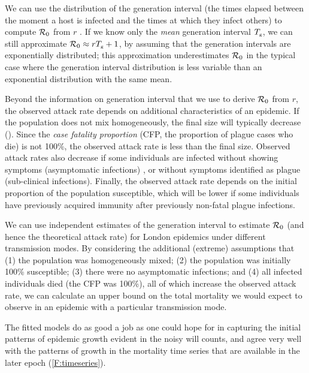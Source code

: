 We can use the distribution of the generation interval (the times elapsed between the moment a host is infected and the times at which they infect others) to compute ${\mathcal R}_0$ from $r$ \cite{WallLips07}. If we know only the \emph{mean} generation interval $T_{\mbox{\tiny g}}$, we can still approximate ${\mathcal R}_0 \approx r T_{\mbox{\tiny g}} +1$, by assuming that the generation intervals are exponentially distributed; this approximation underestimates ${\mathcal R}_0$ in the typical case where the generation interval distribution is less variable than an exponential distribution with the same mean.

Beyond the information on generation interval that we use to derive ${\mathcal R}_0$ from $r$, the observed attack rate depends on additional characteristics of an epidemic. If the population does not mix homogeneously, the final size will typically decrease (\eg \cite[Fig.\,6]{Roll+15}). Since the \emph{case fatality proportion} (CFP, the proportion of plague cases who die) is not 100\%, the observed attack rate is less than the final size. Observed attack rates also decrease if some individuals are infected without showing symptoms (asymptomatic infections) \cite{Mars+67}, or without symptoms identified as plague (sub-clinical infections). Finally, the observed attack rate depends on the initial proportion of the population susceptible, which will be lower if some individuals have previously acquired immunity after previously non-fatal plague infections. 

We can use independent estimates of the generation interval to estimate ${\mathcal R}_0$ (and hence the theoretical attack rate) for London epidemics under different transmission modes. By considering the additional (extreme) assumptions that \hypertarget{4assumptions}{} (1) the population was homogeneously mixed; (2) the population was initially 100\% susceptible; (3) there were no asymptomatic infections; and (4) all infected individuals died (\ie the CFP was 100\%), all of which increase the observed attack rate, we can calculate an upper bound on the total mortality we would expect to observe in an epidemic with a particular transmission mode.


The fitted models do as good a job as one could hope for in capturing the initial patterns of epidemic growth evident in the noisy will counts, and agree very well with the patterns of growth in the mortality time series that are available in the later epoch (\cref{F:timeseries}).

